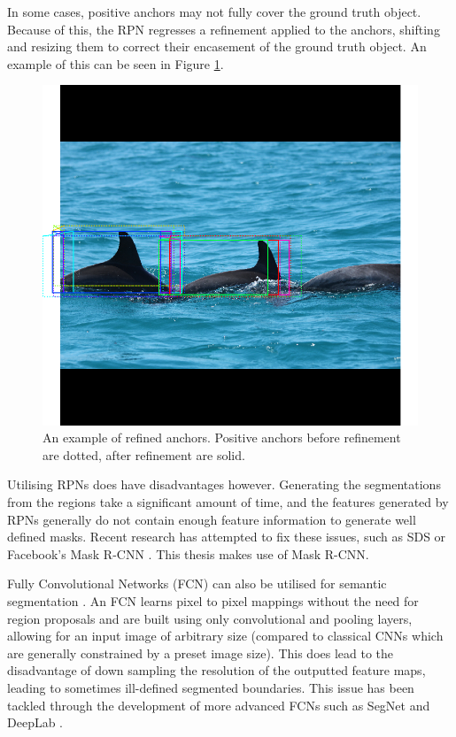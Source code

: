 In some cases, positive anchors may not fully cover the ground truth object. Because of this, the RPN regresses a refinement applied to the anchors, shifting and resizing them to correct their encasement of the ground truth object. An example of this can be seen in Figure \ref{fig:rpn-refined}.

\begin{figure}
	\begin{center}
		\includegraphics[scale=0.3]{Chapter2/figs/rpn-refined.png}
	\end{center}
	\caption{An example of refined anchors. Positive anchors before refinement are dotted, after refinement are solid.}
	\label{fig:rpn-refined}
\end{figure}

Utilising RPNs does have disadvantages however. Generating the segmentations from the regions take a significant amount of time, and the features generated by RPNs generally do not contain enough feature information to generate well defined masks. Recent research has attempted to fix these issues, such as SDS \cite{hariharan_simultaneous_2014} or Facebook's Mask R-CNN \cite{he_mask_2017}. This thesis makes use of Mask R-CNN.

Fully Convolutional Networks (FCN) can also be utilised for semantic segmentation \cite{long_fully_2014}. An FCN learns pixel to pixel mappings without the need for region proposals and are built using only convolutional and pooling layers, allowing for an input image of arbitrary size (compared to classical CNNs which are generally constrained by a preset image size). This does lead to the disadvantage of down sampling the resolution of the outputted feature maps, leading to sometimes ill-defined segmented boundaries. This issue has been tackled through the development of more advanced FCNs such as SegNet \cite{badrinarayanan_segnet:_2015} and DeepLab \cite{chen_semantic_2014}. 


